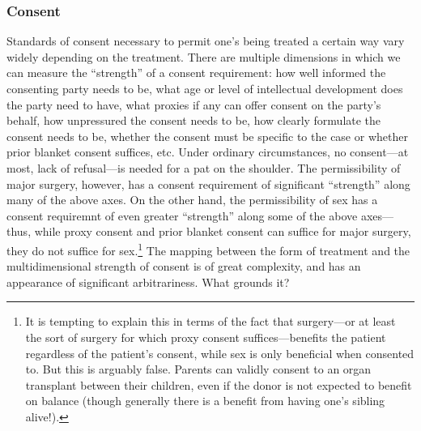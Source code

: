 \subsubsection{Consent}
Standards of consent necessary to permit one's being treated a certain way vary widely depending on the treatment.
There are multiple dimensions in which we can measure the ``strength'' of a consent requirement: how well informed the 
consenting party needs to be, what age or level of intellectual development does the party need to have, what proxies if
any can offer consent on the party's behalf, how unpressured the consent needs to be, how clearly formulate the consent
needs to be, whether the consent must be specific to the case or whether prior blanket consent suffices, etc.
Under ordinary circumstances, no consent---at most, lack of refusal---is needed for a pat on the shoulder. The permissibility
of major surgery, however, has a consent requirement of significant ``strength'' along many of the above axes. On the other hand,
the permissibility of sex has a consent requiremnt of even greater ``strength'' along some of the above axes---thus, while
proxy consent and prior blanket consent can suffice for major surgery, they do not suffice for sex.\footnote{It is tempting
to explain this in terms of the fact that surgery---or at least the sort of surgery for which proxy consent suffices---benefits 
the patient regardless of the patient's consent, while sex is only beneficial when consented to. But this is arguably false.
Parents can validly consent to an organ transplant between their children, even if the donor is not expected to benefit
on balance (though generally there is a benefit from having one's sibling alive!).} The mapping between
the form of treatment and the multidimensional strength of consent is of great complexity, and has an appearance of significant
arbitrariness. What grounds it?

